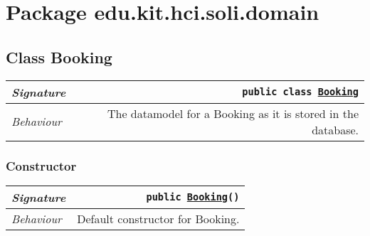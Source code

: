 

\section{Package edu.kit.hci.soli.domain}
\begin{adjustwidth}{1.5em}{0pt}
  \subsection{Class Booking\label{edu.kit.hci.soli.domain.Booking} }
  \begin{adjustwidth}{1.5em}{0pt}
    {\begin{tabularx}{1.0\linewidth}{@{}l R@{}}
      \emph{Signature} & \texttt{public  class \texttt{\hyperref[edu.kit.hci.soli.domain.Booking]{\texttt{Booking}}}} \\
      \hline
      \emph{Behaviour} & The datamodel for a Booking as it is stored in the database.  \\
      \hline
  
    \end{tabularx}}\subsubsection{Constructor\label{edu.kit.hci.soli.domain.Booking@edu.kit.hci.soli.domain.Booking()}}
    \begin{adjustwidth}{1.5em}{0pt}
      {\begin{tabularx}{1.0\linewidth}{@{}l R@{}}
        \emph{Signature} & \texttt{public \texttt{\hyperref[edu.kit.hci.soli.domain.Booking]{\texttt{Booking}}}()} \\
        \hline
        \emph{Behaviour} & Default constructor for Booking.  \\
        \hline
  

\end{tabularx}}
\end{adjustwidth}
\end{adjustwidth}
\end{adjustwidth}
